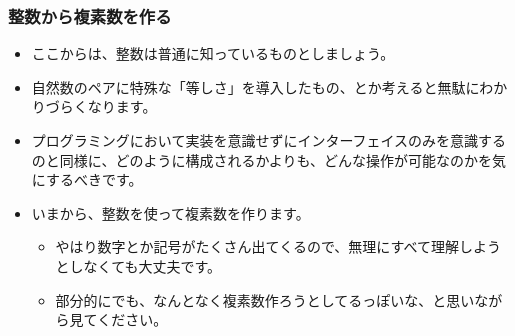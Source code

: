 \documentclass[dvipdfmx]{beamer}
\begin{document}
  \begin{frame}
    \frametitle{整数から複素数を作る}

    \begin{itemize}
      \item ここからは、整数は普通に知っているものとしましょう。
      \item 自然数のペアに特殊な「等しさ」を導入したもの、とか考えると無駄にわかりづらくなります。
      \item プログラミングにおいて実装を意識せずにインターフェイスのみを意識するのと同様に、どのように構成されるかよりも、どんな操作が可能なのかを気にするべきです。
      \item いまから、整数を使って複素数を作ります。
      \begin{itemize}
        \item やはり数字とか記号がたくさん出てくるので、無理にすべて理解しようとしなくても大丈夫です。
        \item 部分的にでも、なんとなく複素数作ろうとしてるっぽいな、と思いながら見てください。
      \end{itemize}
    \end{itemize}

  \end{frame}
\end{document}
